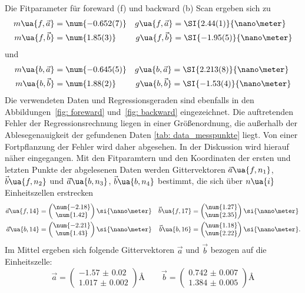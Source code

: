 Die Fitparameter für foreward (f) und backward (b) Scan ergeben sich zu
\begin{align}
  m\ua{f, \vec{a}} &= \num{-0.652(7)} & g\ua{f, \vec{a}} &= \SI{2.44(1)}{\nano\meter} \\
  m\ua{f, \vec{b}} &= \num{1.85(3)} & g\ua{f, \vec{b}} &= \SI{-1.95(5)}{\nano\meter}
\end{align}
und
\begin{align}
  m\ua{b, \vec{a}} &= \num{-0.645(5)} & g\ua{b, \vec{a}} &= \SI{2.213(8)}{\nano\meter} \\
  m\ua{b, \vec{b}} &= \num{1.88(2)}   & g\ua{b, \vec{b}} &= \SI{-1.53(4)}{\nano\meter}
\end{align}
Die verwendeten Daten und Regressionsgeraden sind ebenfalls in den Abbildungen~\ref{fig: foreward}
und~\ref{fig: backward} eingezeichnet.
Die auftretenden Fehler der Regressionsrechnung liegen in einer Größenordnung, die außerhalb der Ablesegenauigkeit der
gefundenen Daten \ref{tab: data_messpunkte} liegt. Von einer Fortpflanzung der Fehler wird daher abgesehen. In der Diskussion
wird hierauf näher eingegangen.
Mit den Fitparamtern und den Koordinaten der ersten und letzten Punkte der abgelesenen Daten werden Gittervektoren $\vec{a}\ua{f, n_1}$, $\vec{b}\ua{f, n_2}$ und
$\vec{a}\ua{b, n_3}$, $\vec{b}\ua{b, n_4}$ bestimmt, die sich über $n\ua{i}$ Einheitszellen erstrecken
\begin{align}
  \vec{a}\ua{f, 14} &= \begin{pmatrix} \num{-2.18} \\  \num{1.42} \end{pmatrix}\si{\nano\meter} & \vec{b}\ua{f, 17}   &= \begin{pmatrix} \num{1.27} \\ \num{2.35} \end{pmatrix} \si{\nano\meter}\\
  \vec{a}\ua{b, 14} &= \begin{pmatrix}  \num{-2.21} \\ \num{1.43} \end{pmatrix}\si{\nano\meter} &  \vec{b}\ua{b, 16} &= \begin{pmatrix} \num{1.18} \\ \num{2.22} \end{pmatrix} \si{\nano\meter}.
\end{align}
Im Mittel ergeben sich folgende Gittervektoren $\vec{a}$ und $\vec{b}$ bezogen auf die Einheitszelle:
\begin{equation}
  \vec{a} = \begin{pmatrix} \num{-1.57(2)} \\  \num{1.017(2)} \end{pmatrix}\si{\angstrom} \qquad
  \vec{b} = \begin{pmatrix} \num{0.742(7)} \\  \num{1.384(5)} \end{pmatrix}\si{\angstrom}
\end{equation}

